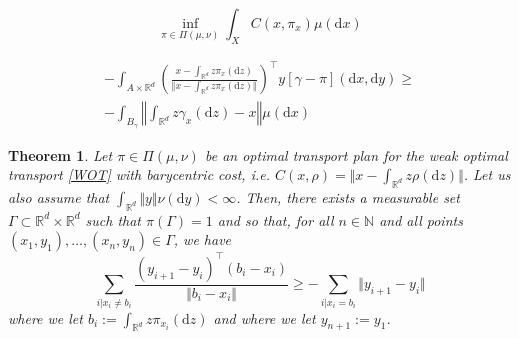 \documentclass[10pt,a4paper]{amsart}
\newtheorem{thm}{Theorem}
\newcommand{\N}{\mathbb{N}}
\newcommand{\R}{\mathbb{R}}
\newcommand{\dd}{\mathrm{d}}
\begin{document}
\begin{equation}\label{WOT}\tag{WOT}
	\inf_{\pi \in \Pi(\mu, \nu)} \int_{X} C(x, \pi_x) \mu(\dd x)
\end{equation}

	\begin{multline}\label{eq:eq33_duh}
		-\int_{A \times \R^d} \left(\frac{x - \int_{\R^d} z \pi_x(\dd z)}{\Vert x - \int_{\R^d} z \pi_x(\dd z) \Vert}\right)^\intercal y [\gamma - \pi](\dd x, \dd y) \geq\\ - \int_{B_\gamma} \left\Vert \int_{\R^d} z \gamma_x(\dd z) - x\right\Vert \mu(\dd x)
	\end{multline}

	\begin{thm}\label{thm:nec-cmon-bar}
		Let $\pi \in \Pi(\mu, \nu)$ be an optimal transport plan for the weak optimal transport \eqref{WOT} with barycentric cost, \textit{i.e.} $C(x, \rho)= \Vert x - \int_{\R^d} z \rho(\dd z)\Vert$. Let us also assume that $\int_{\R^d} \Vert y \Vert \nu(\dd y) < \infty$. Then, there exists a measurable set $\Gamma \subset \R^d \times \R^d$ such that $\pi(\Gamma) = 1$ and so that, for all $n \in \N$ and all points $(x_1, y_1), \dots, (x_n, y_n) \in \Gamma$, we have 
		\begin{equation}\label{eq:c-cmon-bar}
		\boxed{\sum_{i | x_i \neq b_i} \frac{(y_{i+1} - y_i)^\intercal(b_i - x_i)}{\Vert b_i - x_i \Vert} \geq -\sum_{i | x_i = b_i} \Vert y_{i+1} -y_{i} \Vert}
		\end{equation}
	where we let $b_i := \int_{\R^d} z\pi_{x_i}(\dd z)$ and where we let $y_{n+1} := y_1$. 
	\end{thm}
\end{document}

